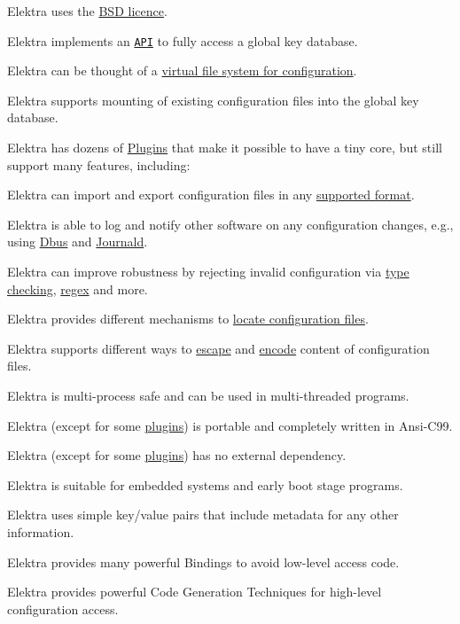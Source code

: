 \begin{DoxyItemize}
\item Elektra uses the \hyperlink{doc_LICENSE_md}{B\+S\+D licence}.
\item Elektra implements an \href{http://doc.libelektra.org/api/latest/html/}{\tt A\+P\+I} to fully access a global key database.
\item Elektra can be thought of a \hyperlink{doc_BIGPICTURE_md}{virtual file system for configuration}.
\item Elektra supports mounting of existing configuration files into the global key database.
\item Elektra has dozens of \hyperlink{md_src_plugins_README_src_plugins_README_md}{Plugins} that make it possible to have a tiny core, but still support many features, including\+:
\begin{DoxyItemize}
\item Elektra can import and export configuration files in any \hyperlink{md_src_plugins_README_src_plugins_README_md}{supported format}.
\item Elektra is able to log and notify other software on any configuration changes, e.\+g., using \hyperlink{md_src_plugins_dbus_README_src_plugins_dbus_README_md}{Dbus} and \hyperlink{md_src_plugins_journald_README_src_plugins_journald_README_md}{Journald}.
\item Elektra can improve robustness by rejecting invalid configuration via \hyperlink{md_src_plugins_type_README_src_plugins_type_README_md}{type checking}, \hyperlink{md_src_plugins_validation_README_src_plugins_validation_README_md}{regex} and more.
\item Elektra provides different mechanisms to \hyperlink{md_src_plugins_resolver_README_src_plugins_resolver_README_md}{locate configuration files}.
\item Elektra supports different ways to \hyperlink{md_src_plugins_ccode_README_src_plugins_ccode_README_md}{escape} and \hyperlink{md_src_plugins_iconv_README_src_plugins_iconv_README_md}{encode} content of configuration files.
\end{DoxyItemize}
\item Elektra is multi-\/process safe and can be used in multi-\/threaded programs.
\item Elektra (except for some \hyperlink{md_src_plugins_README_src_plugins_README_md}{plugins}) is portable and completely written in Ansi-\/\+C99.
\item Elektra (except for some \hyperlink{md_src_plugins_README_src_plugins_README_md}{plugins}) has no external dependency.
\item Elektra is suitable for embedded systems and early boot stage programs.
\item Elektra uses simple key/value pairs that include metadata for any other information.
\item Elektra provides many powerful Bindings to avoid low-\/level access code.
\item Elektra provides powerful Code Generation Techniques for high-\/level configuration access.
\end{DoxyItemize}

